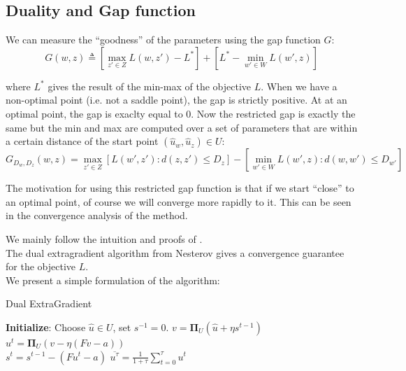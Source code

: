 \clearpage
\subsection{Duality and Gap function}
We can measure the ``goodness'' of the parameters using the gap function
${G}$:
\begin{equation}
  {G}( w,  z) \triangleq \left[ \max_{ z' \in {Z}}
{L}( w, z') - {L}^* \right] + \left[ {L}^* -
\min_{ w' \in {W}} {L}( w',  z) \right]
\end{equation}

where ${L}^*$ gives the result of the min-max of the objective
${L}$. When we have a non-optimal point (i.e. not a saddle point), the
gap is strictly positive. At at an optimal point, the gap is exaclty equal to 0.
Now the restricted gap is exactly the same but the min and max are computed over
a set of parameters that are within a certain distance of the start point
$(\hat{ u}_{ w},\hat{ u}_{ z}) \in {U}$:
\begin{equation}
  {G}_{D_{ w}, D_{ z}}( w,  z) = \max_{ z' \in
{Z}} \left[ {L}( w',  z') : d( z,  z') \leq
D_{ z} \right] - \left [ \min_{ w' \in {W}} {L}( w',
 z) : d( w,  w') \leq D_{ w'} \right ]
\end{equation}

The motivation for using this restricted gap function is that if we start
``close'' to an optimal point, of course we will converge more rapidly to it.
This can be seen in the convergence analysis of the method.






We mainly follow the intuition and proofs of
\cite{taskarStructuredPredictionDual2006}.\\
The dual extragradient algorithm from Nesterov gives a convergence guarantee for
the objective ${L}$.\\
We present a simple formulation of the algorithm:
\begin{algorithm}
  \caption{Dual ExtraGradient}
  \label{alg:extra}
\begin{algorithmic}
  \STATE \textbf{Initialize}: Choose $\hat{ u} \in {U}$, set $ s^{-1} = 0$.
  \STATE $ v = \mathbf{\Pi}_{{U}}(\hat{ u} + \eta  s^{t-1})$\\
  \STATE $ u^t = \mathbf{\Pi}_{{U}}( v - \eta ( F  v -  a))$\\
  \STATE $ s^t =   s^{t-1} - ( F  u^t -  a)$
  \ENDFOR
  \RETURN $\overline{ u^{\tau}} = \frac{1}{1 + \tau} \sum_{t=0}^{\tau}  u^t$
\end{algorithmic}
\end{algorithm}

